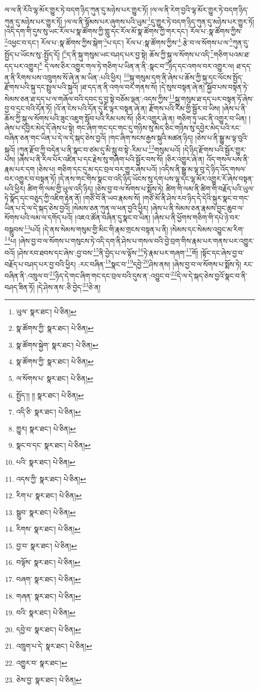 ལ་ལ་ནི་རོའི་ལྷ་མོར་གྱུར་ཏེ་བདག་ཉིད་ཀུན་དུ་མཉེས་པར་གྱུར་ཏོ། །ལ་ལ་ནི་རེག་བྱའི་ལྷ་མོར་གྱུར་ཏེ་བདག་ཉིད་ཀུན་དུ་མཉེས་པར་གྱུར་ཏོ། །ལ་ལ་ནི་སྙོམས་པར་ཞུགས་པའི་ཡུམ་\footnote{ཡུལ་  སྣར་ཐང་།  པེ་ཅིན། }དུ་གྱུར་ཏེ་བདག་ཉིད་ཀུན་དུ་མཉེས་པར་གྱུར་ཏོ། །འདི་དག་གི་དུས་སུ་ཡང་རོལ་པ་སྣ་ཚོགས་ཀྱི་གླུ་དང་རོལ་མོ་སྣ་ཚོགས་ཀྱི་གར་དང་། རོལ་པ་:སྣ་ཚོགས་ཀྱིས་\footnote{སྣ་ཚོགས་ཀྱི་  སྣར་ཐང་།  པེ་ཅིན། }འཕྱང་བ་དང་། རོལ་པ་:སྣ་ཚོགས་ཀྱིས་སྒེག་\footnote{སྣ་ཚོགས་སྐྱེག་  སྣར་ཐང་།  པེ་ཅིན། }པ་དང་། རོལ་པ་:སྣ་ཚོགས་ཀྱིས་\footnote{སྣ་ཚོགས་ཀྱི་  སྣར་ཐང་།  པེ་ཅིན། }:རྩེ་བ་ལ་སོགས་པ་ལ་\footnote{ལ་སོགས་པ་  སྣར་ཐང་།  པེ་ཅིན། }ཀུན་དུ་སྤྱོད་པ་ཡོངས་སུ་:སྤྱོད་དོ། །\footnote{སྤྱོད་།། །།  སྣར་ཐང་།  པེ་ཅིན། }ད་ནི་སྐུ་གསུམ་ཡང་བཤད་པར་བྱ་སྟེ། ཆོས་ཀྱི་སྐུ་ལ་སོགས་པ་འདི་\footnote{འདི་ཅི་  སྣར་ཐང་།  པེ་ཅིན། }གཅིག་པའམ་ཐ་དད་པར་འགྱུར།\footnote{གྱུར།  སྣར་ཐང་།  པེ་ཅིན། } དེ་ལས་ཅིར་འགྱུར་གལ་ཏེ་གཅིག་པ་ཡིན་ན་ནི་:སྣང་བ་\footnote{སྣང་བ་དང་  སྣར་ཐང་།  པེ་ཅིན། }ཉིད་དང་འགལ་བར་འགྱུར་ལ། ཐ་དད་ན་ནི་རིགས་པས་འཁྲུགས་སོ་ཞེ་ན་མ་ཡིན་:པའི་ཕྱིར། \footnote{པའི་  སྣར་ཐང་།  པེ་ཅིན། }སྐུ་གསུམ་དག་ནི་ཞེས་པ་ཆོས་ཀྱི་སྐུ་དང་ལོངས་སྤྱོད་རྫོགས་པའི་སྐུ་དང་སྤྲུལ་པའི་སྐུའོ། །ཐ་དད་ན་ནི་འགལ་བར་གནས་སོ། །དེ་སུས་བསྟན་ཞེ་ན། སྐྱོབ་པས་བསྟན་ཏེ་སེམས་ཅན་ཐ་དད་པ་ལ་གཞོལ་བའི་དབང་དུ་བྱ་སྟེ་བཅོམ་ལྡན་:འདས་ཀྱིས་\footnote{འདས་ཀྱི་  སྣར་ཐང་།  པེ་ཅིན། }སྐུ་གསུམ་ཐ་དད་པར་བསྟན་ཏོ་ཞེས་བྱ་བ་དྲང་བའི་དོན་ཏོ། །འོ་ན་ངེས་པའི་དོན་དུ་ཇི་ལྟར་བསྟན་ཞེ་ན། རྫོགས་པའི་རིམ་གྱི་སྦྱོར་བ་ཡིས། །ཞེས་པ་ནི་ཆོས་ཀྱི་སྐུ་ལ་སོགས་པའི་ཟུང་འཇུག་སློབ་པའི་རིམ་པས་སོ། །ཅིར་འགྱུར་ཞེ་ན། གཅིག་ཏུ་ཡང་ནི་འགྱུར་བ་ཡིན། །ཞེས་པ་དབྱེར་མེད་དོ་ཞེས་པ་སྟེ། གང་ཞིག་གང་དང་གང་དུ་གཉིས་སུ་མེད་ཅིང་གཉིས་སུ་དབྱེར་མེད་པའི་རང་བཞིན་ཅན་གང་ཡིན་པ་དེ་ལ་དེ་སྐད་ཅེས་བྱའོ། །གང་ཞིག་སངས་རྒྱས་སྐུའི་མཚན་ཉིད། །ཅེས་པ་ནི་སྒྱུ་མ་ལྟ་བུའི་སྐུའོ། །ཀུན་རྫོབ་ཀྱི་བདེན་པ་ནི་སྣང་བ་ཙམ་དུ་མི་སླུ་བ་སྟེ་:རིམ་པ་\footnote{རིག་པ་  སྣར་ཐང་།  པེ་ཅིན། }གསུམ་པའོ། །དེ་ཉིད་རྫོགས་པའི་སྦྱོར་གྱུར་པས། །ཞེས་པ་ནི་རིལ་པོར་འཛིན་པ་དང་རྗེས་སུ་གཞིག་པའི་སྦྱོར་བས་སོ། །ཅིར་འགྱུར་ཞེ་ན། འོད་གསལ་པས་ནི་རྣམ་པར་དག །ཅེས་པ། གཅིག་དང་དུ་མ་དང་བྲལ་བར་གྱུར་ཞེས་པའོ། །འདིས་ནི་སྒྱུ་མ་ལྟ་བུ་དེ་ཉིད་འོད་གསལ་བར་འགྱུར་བ་བསྟན་ཏོ། །དེ་ནས་གང་གིས་སྣང་བ་འདི་ཉིད་ཡོངས་སུ་དག་པས་ལྷ་དང་ལྷ་མོར་འགྱུར་རོ་ཞེས་བསྟན་པའི་ཕྱིར། ཚིག་གི་ལམ་གྱི་ཡུལ་འདི་ཉིད། །ཅེས་བྱ་བ་ལ་སོགས་པ་སྨོས་ཏེ། ཚིག་གི་ལམ་ནི་ཚིག་གི་བརྗོད་པའི་ཡུལ་ཏེ་སྣོད་དང་བཅུད་ཀྱི་འཇིག་རྟེན་ནོ། །གཙོ་བོ་ནི་ཡབ་རྣམས་སོ། །གཙོ་མོ་ནི་ཤེས་རབ་ཉིད་དེ་དེའི་སྐུར་སྣང་བ་གང་ཡིན་པ་དེ་ལ་དེ་སྐད་ཅེས་བྱའོ། །སེམས་ཅན་ཀུན་ལ་ཕན་བྱའི་ཕྱིར། །ཞེས་པ་ནི་སེམས་ཅན་རྣམས་བྱང་ཆུབ་ལ་སོགས་པའི་ལམ་ལ་དགོད་པའོ། །འཇའ་ཚོན་བཞིན་དུ་སྣང་བ་ཡིན། །ཞེས་པ་ནི་ཕྱོགས་གཅིག་གི་དཔེ་ཉེ་བར་བསྒྲུབས་\footnote{སྒྲུབ་  སྣར་ཐང་།  པེ་ཅིན། }པའོ། །དེ་ནས་སེམས་གསུམ་གྱི་མིང་གི་རྣམ་གྲངས་བསྟན་པ་ནི། །སེམས་དང་སེམས་འབྱུང་མ་རིག་\footnote{རིགས་  སྣར་ཐང་།  པེ་ཅིན། }པ། །ཞེས་བྱ་བ་ལ་སོགས་པ་གསུངས་ཏེ་འདི་དག་ནི་ཤེས་པ་གསལ་བའི་བྱེ་བྲག་གིས་རྣམ་པར་གནས་པར་འགྱུར་བའོ། །ཤེས་རབ་ཐབས་དང་ཞེས་:བྱ་བས་\footnote{བྱ་བ་  སྣར་ཐང་།  པེ་ཅིན། }ནི་བྱེད་པ་ལ་ལྟོས་\footnote{བལྟོས་  སྣར་ཐང་།  པེ་ཅིན། }ཏེ་རྣམ་པར་གཞག་\footnote{བཞག་  སྣར་ཐང་།  པེ་ཅིན། }གོ། །སྟོང་དང་ཞེས་བྱ་བ་བརྗོད་པ་བཤད་པར་བྱ་བའི་ཕྱིར། :རང་བཞིན་\footnote{གཞན་  སྣར་ཐང་།  པེ་ཅིན། }སྣང་བ་\footnote{བའི་  སྣར་ཐང་།  པེ་ཅིན། }དབྱེ་\footnote{དབྱེ་བ་  སྣར་ཐང་།  པེ་ཅིན། }ཤེས་ནས། །ཞེས་བྱ་བ་ལ་སོགས་པ་སྨོས་ཏེ། རང་བཞིན་ནི་:འཁྲུལ་བ་\footnote{འཁྲུག་པ་དེ་  སྣར་ཐང་།  པེ་ཅིན། }ཉིད་དེ་གང་ཞིག་གང་དང་བྲལ་བའི་དུས་ན་:འབྱུང་བ་\footnote{འགྱུར་བ་  སྣར་ཐང་། }དེ་ལ་དེ་སྐད་ཅེས་བྱའོ་སྣང་བ་ནི་བཤད་ཟིན་ཏོ། །དེ་ཤེས་ནས་:ཅི་བྱེད་\footnote{ཅེས་བྱ་  སྣར་ཐང་།  པེ་ཅིན། }ཅེ་ན། 